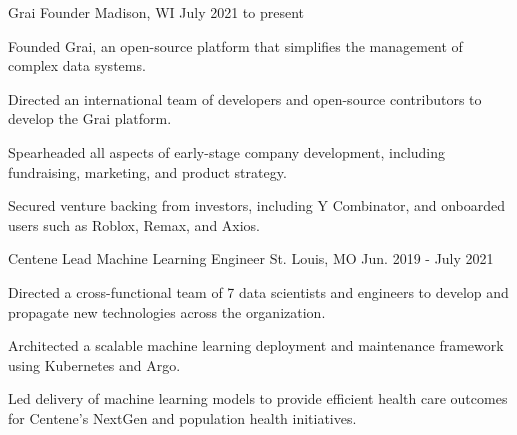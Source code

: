 

\begin{cventries}
  \cventry
    {Grai} %
    {Founder} %
    {Madison, WI} %
    {July 2021 to present} %
    {
      \begin{cvitems} %
        \item {Founded Grai, an open-source platform that simplifies the management of complex data systems.}
        \item {Directed an international team of developers and open-source contributors to develop the Grai platform.}
        \item {Spearheaded all aspects of early-stage company development, including fundraising, marketing, and product strategy.}
        \item {Secured venture backing from investors, including Y Combinator, and onboarded users such as Roblox, Remax, and Axios.}
      \end{cvitems}
    }
  \vspace{2em}

  \cventry
    {Centene} %
    {Lead Machine Learning Engineer} %
    {St. Louis, MO} %
    {Jun. 2019 - July 2021} %
    {
      \begin{cvitems} %
        \item {Directed a cross-functional team of 7 data scientists and engineers to develop and propagate new technologies across the organization.}
        \item {Architected a scalable machine learning deployment and maintenance framework using Kubernetes and Argo.}
        \item {Led delivery of machine learning models to provide efficient health care outcomes for Centene's NextGen and population health initiatives.}
      \end{cvitems}
    }
    \vspace{2em}


\end{cventries}
